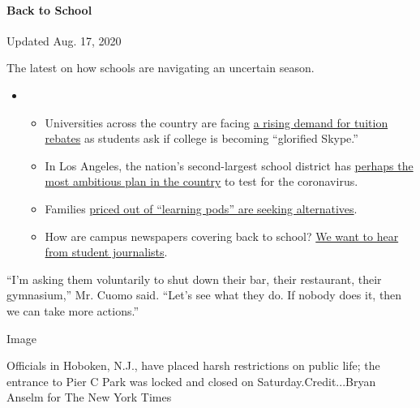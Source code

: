 \hypertarget{back-to-school}{%
\paragraph{Back to School}\label{back-to-school}}

Updated Aug. 17, 2020

The latest on how schools are navigating an uncertain season.

\begin{itemize}
\item
  \begin{itemize}
  \tightlist
  \item
    Universities across the country are facing
    \href{https://www.nytimes.com/2020/08/15/us/covid-college-tuition.html?action=click\&pgtype=Article\&state=default\&region=MAIN_CONTENT_3\&context=storylines_keepup}{a
    rising demand for tuition rebates} as students ask if college is
    becoming ``glorified Skype.''
  \item
    In Los Angeles, the nation's second-largest school district has
    \href{https://www.nytimes.com/2020/08/16/us/los-angeles-schools-virus-testing.html?action=click\&pgtype=Article\&state=default\&region=MAIN_CONTENT_3\&context=storylines_keepup}{perhaps
    the most ambitious plan in the country} to test for the coronavirus.
  \item
    Families
    \href{https://www.nytimes.com/2020/08/14/us/covid-schools-learning-pods.html?action=click\&pgtype=Article\&state=default\&region=MAIN_CONTENT_3\&context=storylines_keepup}{priced
    out of ``learning pods'' are seeking alternatives}.
  \item
    How are campus newspapers covering back to school?
    \href{https://www.nytimes.com/2020/08/17/us/student-newspaper-schools-reopening.html?action=click\&pgtype=Article\&state=default\&region=MAIN_CONTENT_3\&context=storylines_keepup}{We
    want to hear from student journalists}.
  \end{itemize}
\end{itemize}

``I'm asking them voluntarily to shut down their bar, their restaurant,
their gymnasium,'' Mr. Cuomo said. ``Let's see what they do. If nobody
does it, then we can take more actions.''

Image

Officials in Hoboken, N.J., have placed harsh restrictions on public
life; the entrance to Pier C Park was locked and closed on
Saturday.Credit...Bryan Anselm for The New York Times

